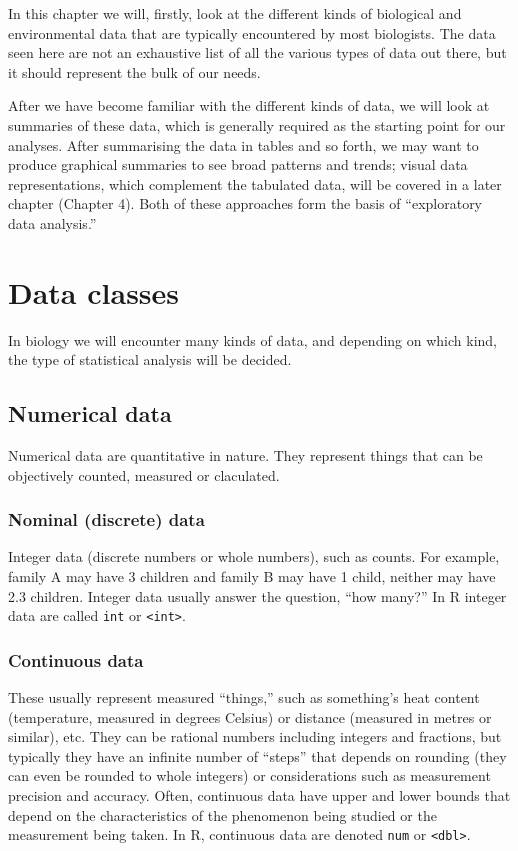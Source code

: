\documentclass[english,10pt,a4paper,oneside]{book}
\theoremstyle{definition}
\theoremstyle{definition}
\theoremstyle{definition}
\theoremstyle{remark}
\begin{document}
In this chapter we will, firstly, look at the different kinds of
biological and environmental data that are typically encountered by most
biologists. The data seen here are not an exhaustive list of all the
various types of data out there, but it should represent the bulk of our
needs.

After we have become familiar with the different kinds of data, we will
look at summaries of these data, which is generally required as the
starting point for our analyses. After summarising the data in tables
and so forth, we may want to produce graphical summaries to see broad
patterns and trends; visual data representations, which complement the
tabulated data, will be covered in a later chapter (Chapter 4). Both of
these approaches form the basis of \enquote{exploratory data analysis.}

\section{Data classes}\label{data-classes}

In biology we will encounter many kinds of data, and depending on which
kind, the type of statistical analysis will be decided.

\subsection{Numerical data}\label{numerical-data}

Numerical data are quantitative in nature. They represent things that
can be objectively counted, measured or claculated.

\subsubsection{Nominal (discrete) data}\label{nominal-discrete-data}

Integer data (discrete numbers or whole numbers), such as counts. For
example, family A may have 3 children and family B may have 1 child,
neither may have 2.3 children. Integer data usually answer the question,
\enquote{how many?} In R integer data are called \texttt{int} or
\texttt{\textless{}int\textgreater{}}.

\subsubsection{Continuous data}\label{continuous-data}

These usually represent measured \enquote{things,} such as something's
heat content (temperature, measured in degrees Celsius) or distance
(measured in metres or similar), etc. They can be rational numbers
including integers and fractions, but typically they have an infinite
number of \enquote{steps} that depends on rounding (they can even be
rounded to whole integers) or considerations such as measurement
precision and accuracy. Often, continuous data have upper and lower
bounds that depend on the characteristics of the phenomenon being
studied or the measurement being taken. In R, continuous data are
denoted \texttt{num} or \texttt{\textless{}dbl\textgreater{}}.
\end{document}
